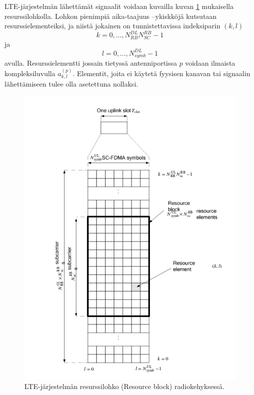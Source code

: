 \documentclass[finnish,12pt,a4paper,pdftex]{article}
\begin{document}
LTE-järjestelmän lähettämät signaalit voidaan kuvailla kuvan \ref{fig:PRB} mukaisella resurssilohkolla. Lohkon pienimpiä aika-taajuus --ykiskköjä kutsutaan resurssielementeiksi, ja niistä jokainen on tunnistettavissa indeksiparin $(k,l)$
\begin{equation}
    k = 0, ..., N^{DL}_{RB}N^{RB}_{SC} -1
\end{equation} 
ja
\begin{equation}
    l = 0, ..., N^{DL}_{symb} -1
\end{equation}
avulla. Resurssielementti jossain tietyssä antenniportissa $p$ voidaan ilmaista kompleksiluvulla $a_{k,l}^{(p)}$. Elementit, joita ei käytetä fyysisen kanavan tai signaalin lähettämiseen tulee olla asetettuna nollaksi. \cite{ETSIts36211}
~\begin{figure}[h!]
    \centering
    \includegraphics[scale=0.5]{Images/ResourceBlock.png}
    \caption{LTE-järjestelmän resurssilohko (Resource block) radiokehyksessä.\cite{ETSIts36211}}
    \label{fig:PRB}
\end{figure}
\end{document}
